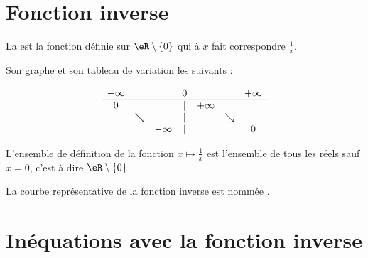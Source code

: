 \section{Fonction inverse}

\begin{definition}
    La  est la fonction définie sur \( \eR\setminus\{ 0 \}\) qui à \( x\) fait correspondre \( \frac{1}{ x }\).
\end{definition}

Son graphe et son tableau de variation les suivants : 
\begin{multicols}{2}

\begin{equation*}
    \begin{array}[]{ccccccc}
        -\infty&&&0&&&+\infty\\
        \hline
        0&&&|&+\infty&&\\
        &\searrow&&|&&\searrow&\\
        &&-\infty&|&&&0\\
    \end{array}
\end{equation*}

\columnbreak

\begin{center}

\end{center}
\end{multicols}

L'ensemble de définition de la fonction \( x\mapsto \frac{1}{ x }\) est l'ensemble de tous les réels sauf \( x=0\), c'est à dire \( \eR\setminus\{ 0 \}\).

\begin{definition}
    La courbe représentative de la fonction inverse est nommée .
\end{definition}

\section{Inéquations avec la fonction inverse}

